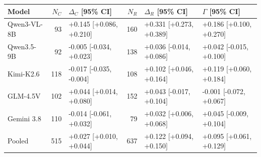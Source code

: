 \begin{tabular}{lrlrll}
\toprule
Model & $N_C$ & $\Delta_C$ [95\% CI] & $N_R$ & $\Delta_R$ [95\% CI] & $\Gamma$ [95\% CI] \\
\midrule
Qwen3-VL-8B & 93 & +0.145 [+0.086, +0.210] & 160 & +0.331 [+0.273, +0.389] & +0.186 [+0.100, +0.270] \\
Qwen3.5-9B & 92 & -0.005 [-0.034, +0.023] & 138 & +0.036 [-0.014, +0.086] & +0.042 [-0.015, +0.100] \\
Kimi-K2.6 & 118 & -0.017 [-0.035, -0.004] & 108 & +0.102 [+0.046, +0.164] & +0.119 [+0.060, +0.184] \\
GLM-4.5V & 102 & +0.044 [+0.014, +0.080] & 152 & +0.043 [-0.017, +0.104] & -0.001 [-0.072, +0.067] \\
Gemini 3.8 & 110 & -0.014 [-0.061, +0.032] & 79 & +0.032 [+0.006, +0.068] & +0.045 [-0.009, +0.104] \\
Pooled & 515 & +0.027 [+0.010, +0.044] & 637 & +0.122 [+0.094, +0.150] & +0.095 [+0.061, +0.129] \\
\bottomrule
\end{tabular}
